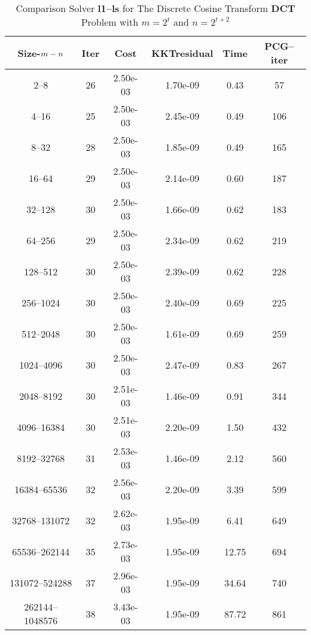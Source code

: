 \begin{table}
\caption{Comparison Solver  {\bf l1--ls}  for  The Discrete Cosine Transform {\bf DCT} Problem with  $m=2^{t}$ and $n=2^{t+2}$} 
\begin{center}
\begin{tabular}{|*{6}{c}|} \hline
Size-$m\--n$ & \multicolumn{1}{c}{Iter} & \multicolumn{1}{c}{Cost}& \multicolumn{1}{c}{KKTresidual} & \multicolumn{1}{c}{Time} & \multicolumn{1}{c|}{PCG--iter} \\ 
\hline
2--8             &26     &2.50e-03  &1.70e-09  &0.43   &57    \\
4--16            &25     &2.50e-03  &2.45e-09  &0.49   &106   \\
8--32            &28     &2.50e-03  &1.85e-09  &0.49   &165   \\
16--64           &29     &2.50e-03  &2.14e-09  &0.60   &187   \\
32--128          &30     &2.50e-03  &1.66e-09  &0.62   &183   \\
64--256          &29     &2.50e-03  &2.34e-09  &0.62   &219   \\
128--512         &30     &2.50e-03  &2.39e-09  &0.62   &228   \\
256--1024        &30     &2.50e-03  &2.40e-09  &0.69   &225   \\
512--2048        &30     &2.50e-03  &1.61e-09  &0.69   &259   \\
1024--4096       &30     &2.50e-03  &2.47e-09  &0.83   &267   \\
2048--8192       &30     &2.51e-03  &1.46e-09  &0.91   &344   \\
4096--16384      &30     &2.51e-03  &2.20e-09  &1.50   &432   \\
8192--32768      &31     &2.53e-03  &1.46e-09  &2.12   &560   \\
16384--65536     &32     &2.56e-03  &2.20e-09  &3.39   &599   \\
32768--131072    &32     &2.62e-03  &1.95e-09  &6.41   &649   \\
65536--262144    &35     &2.73e-03  &1.95e-09  &12.75  &694   \\
131072--524288   &37     &2.96e-03  &1.95e-09  &34.64  &740   \\
262144--1048576  &38     &3.43e-03  &1.95e-09  &87.72  &861   \\

\hline
\end{tabular}
\end{center}
\end{table}

